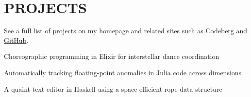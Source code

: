 \section{PROJECTS}

See a full list of projects on my \href{https://lambdaland.org/#projects}{homepage} and related sites such as \href{https://codeberg.org/ashton314}{Codeberg} and \href{https://github.com/ashton314/}{GitHub}.\\

\begin{itemize}[leftmargin=0pt,itemsep=4pt]
  {Choreographic programming in Elixir for interstellar dance coordination}

  {Automatically tracking floating-point anomalies in Julia code across dimensions}

  {A quaint text editor in Haskell using a space-efficient rope data structure}
\end{itemize}
